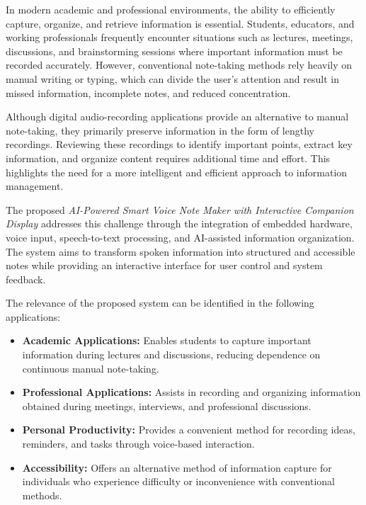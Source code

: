 \documentclass[a4paper,12pt,oneside]{report}
\begin{document}
In modern academic and professional environments, the ability to
efficiently capture, organize, and retrieve information is essential.
Students, educators, and working professionals frequently encounter
situations such as lectures, meetings, discussions, and brainstorming
sessions where important information must be recorded accurately.
However, conventional note-taking methods rely heavily on manual
writing or typing, which can divide the user's attention and result
in missed information, incomplete notes, and reduced concentration.

Although digital audio-recording applications provide an alternative
to manual note-taking, they primarily preserve information in the
form of lengthy recordings. Reviewing these recordings to identify
important points, extract key information, and organize content
requires additional time and effort. This highlights the need for
a more intelligent and efficient approach to information management.

The proposed \textit{AI-Powered Smart Voice Note Maker with
Interactive Companion Display} addresses this challenge through
the integration of embedded hardware, voice input, speech-to-text
processing, and AI-assisted information organization. The system
aims to transform spoken information into structured and accessible
notes while providing an interactive interface for user control
and system feedback.

The relevance of the proposed system can be identified in the
following applications:

\begin{itemize}
    \item \textbf{Academic Applications:}
    Enables students to capture important information during
    lectures and discussions, reducing dependence on continuous
    manual note-taking.

    \item \textbf{Professional Applications:}
    Assists in recording and organizing information obtained
    during meetings, interviews, and professional discussions.

    \item \textbf{Personal Productivity:}
    Provides a convenient method for recording ideas, reminders,
    and tasks through voice-based interaction.

    \item \textbf{Accessibility:}
    Offers an alternative method of information capture for
    individuals who experience difficulty or inconvenience
    with conventional methods.
\end{itemize}
\end{document}

